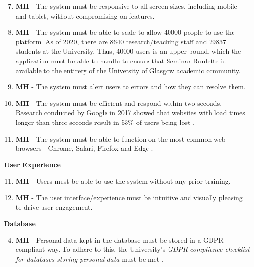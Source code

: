 \documentclass{l4proj}
\begin{document}
\begin{enumerate}[label=S\arabic*]
    \setcounter{enumi}{6}
    \item\label{non_functional_requirement:mobile_responsive} \textbf{MH} - The system must be responsive to all screen sizes, including mobile and tablet, without compromising on features.
    \item\label{non_functional_requirement:scale_large_number_users} \textbf{MH} - The system must be able to scale to allow \num{40000} people to use the platform. As of 2020, there are 8640 research/teaching staff \citep{uofgstaffnumbers} and 29837 students \citep{uofgstudentnumbers} at the University. Thus, \num{40000} users is an upper bound, which the application must be able to handle to ensure that Seminar Roulette is available to the entirety of the University of Glasgow academic community.
    \item\label{non_functional_requirement:alert_users_to_errors} \textbf{MH} - The system must alert users to errors and how they can resolve them.
    \item\label{non_functional_requirement:response_times} \textbf{MH} - The system must be efficient and respond within two seconds. Research conducted by Google in 2017 showed that websites with load times longer than three seconds result in 53\% of users being lost \citep{websiteloadtimes}.
    \item \textbf{MH} - The system must be able to function on the most common web browsers - Chrome, Safari, Firefox and Edge \citep{mostcommonbrowsers}.
\end{enumerate}

\textbf{User Experience}

\begin{enumerate}[label=U\arabic*]
    \setcounter{enumi}{10}
    \item\label{non_functional_requirement:no_prior_training} \textbf{MH} - Users must be able to use the system without any prior training.
    \item\label{non_functional_requirement:intuitive_user_interface} \textbf{MH} - The user interface/experience must be intuitive and visually pleasing to drive user engagement.
\end{enumerate}

\textbf{Database}

\begin{enumerate}[label=D\arabic*]
    \setcounter{enumi}{3}
    \item\label{non_functional_requirement:gdpr} \textbf{MH} - Personal data kept in the database must be stored in a GDPR compliant way. To adhere to this, the University's \emph{GDPR compliance checklist for databases storing personal data} must be met \citep{uofggdpr}.
\end{enumerate}
\end{document}
